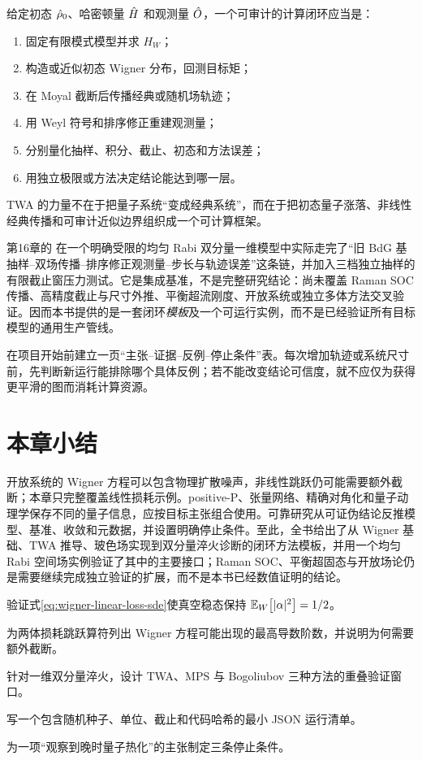 给定初态 $\hat\rho_0$、哈密顿量 $\hat H$ 和观测量 $\hat O$，一个可审计的计算闭环应当是：
\begin{enumerate}
  \item 固定有限模式模型并求 $H_W$；
  \item 构造或近似初态 Wigner 分布，回测目标矩；
  \item 在 Moyal 截断后传播经典或随机场轨迹；
  \item 用 Weyl 符号和排序修正重建观测量；
  \item 分别量化抽样、积分、截止、初态和方法误差；
  \item 用独立极限或方法决定结论能达到哪一层。
\end{enumerate}
TWA 的力量不在于把量子系统“变成经典系统”，而在于把初态量子涨落、非线性经典传播和可审计近似边界组织成一个可计算框架。

第16章的
在一个明确受限的均匀 Rabi 双分量一维模型中实际走完了“旧 BdG 基抽样--双场传播--排序修正观测量--步长与轨迹误差”这条链，并加入三档独立抽样的有限截止窗压力测试。它是集成基准，不是完整研究结论：尚未覆盖 Raman SOC 传播、高精度截止与尺寸外推、平衡超流刚度、开放系统或独立多体方法交叉验证。因而本书提供的是一套闭环\emph{模板}及一个可运行实例，而不是已经验证所有目标模型的通用生产管线。

\begin{chaptercheck}
在项目开始前建立一页“主张--证据--反例--停止条件”表。每次增加轨迹或系统尺寸前，先判断新运行能排除哪个具体反例；若不能改变结论可信度，就不应仅为获得更平滑的图而消耗计算资源。
\end{chaptercheck}

\section*{本章小结}

开放系统的 Wigner 方程可以包含物理扩散噪声，非线性跳跃仍可能需要额外截断；本章只完整覆盖线性损耗示例。positive-P、张量网络、精确对角化和量子动理学保存不同的量子信息，应按目标主张组合使用。可靠研究从可证伪结论反推模型、基准、收敛和元数据，并设置明确停止条件。至此，全书给出了从 Wigner 基础、TWA 推导、玻色场实现到双分量淬火诊断的闭环方法模板，并用一个均匀 Rabi 空间场实例验证了其中的主要接口；Raman SOC、平衡超固态与开放场论仍是需要继续完成独立验证的扩展，而不是本书已经数值证明的结论。

\begin{exercises}
  \item 验证式\eqref{eq:wigner-linear-loss-sde}使真空稳态保持 $\mathbb{E}_{W}\!\left[|\alpha|^2\right]=1/2$。
  \item 为两体损耗跳跃算符列出 Wigner 方程可能出现的最高导数阶数，并说明为何需要额外截断。
  \item 针对一维双分量淬火，设计 TWA、MPS 与 Bogoliubov 三种方法的重叠验证窗口。
  \item 写一个包含随机种子、单位、截止和代码哈希的最小 JSON 运行清单。
  \item 为一项“观察到晚时量子热化”的主张制定三条停止条件。
\end{exercises}
